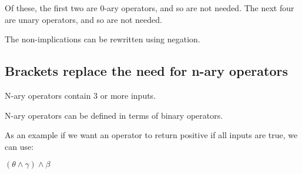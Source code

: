 Of these, the first two are \(0\)-ary operators, and so are not needed. The next four are unary operators, and so are not needed.

The non-implications can be rewritten using negation.

\subsection{Brackets replace the need for n-ary operators}

N-ary operators contain \(3\) or more inputs.

N-ary operators can be defined in terms of binary operators.

As an example if we want an operator to return positive if all inputs are true, we can use:

\((\theta \land \gamma )\land \beta \)


